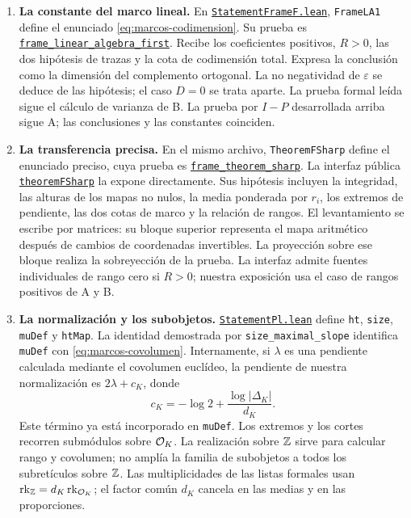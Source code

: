 \begin{enumerate}
\item \textbf{La constante del marco lineal.}
En
\href{https://github.com/CocoSgt/riemann-hypothesis-lean/blob/7cbf7a0c32fca1badf05931879a37c3f8a2b03b4/src/Formalism/HarderNarasimhan/StatementFrameF.lean}{\texttt{StatementFrameF.lean}},
\texttt{FrameLA1} define el enunciado
\eqref{eq:marcos-codimension}. Su prueba es
\href{https://github.com/CocoSgt/riemann-hypothesis-lean/blob/7cbf7a0c32fca1badf05931879a37c3f8a2b03b4/src/Formalism/HarderNarasimhan/HarderNarasimhanProofs/FrameLinearAlgebraFirst.lean}{\texttt{frame\_linear\_algebra\_first}}.
Recibe los coeficientes positivos, $R>0$, las dos hipótesis de trazas
y la cota de codimensión total. Expresa la conclusión como la dimensión
del complemento ortogonal. La no negatividad de $\varepsilon$ se deduce
de las hipótesis; el caso $D=0$ se trata aparte. La prueba formal leída
sigue el cálculo de varianza de B. La prueba por $I-P$ desarrollada
arriba sigue A; las conclusiones y las constantes coinciden.

\item \textbf{La transferencia precisa.}
En el mismo archivo, \texttt{TheoremFSharp} define el enunciado
preciso, cuya prueba es
\href{https://github.com/CocoSgt/riemann-hypothesis-lean/blob/7cbf7a0c32fca1badf05931879a37c3f8a2b03b4/src/Formalism/HarderNarasimhan/HarderNarasimhanProofs/TheoremFSharp.lean}{\texttt{frame\_theorem\_sharp}}.
La interfaz pública
\href{https://github.com/CocoSgt/riemann-hypothesis-lean/blob/7cbf7a0c32fca1badf05931879a37c3f8a2b03b4/src/Formalism/HarderNarasimhan/ShiftInvariance.lean}{\texttt{theoremFSharp}}
la expone directamente. Sus hipótesis incluyen la integridad, las alturas
de los mapas no nulos, la media ponderada por $r_i$, los extremos de
pendiente, las dos cotas de marco y la relación de rangos.
El levantamiento se escribe por matrices: su bloque superior representa
el mapa aritmético después de cambios de coordenadas invertibles.
La proyección sobre ese bloque realiza la sobreyección de la prueba.
La interfaz admite fuentes individuales de rango cero si $R>0$;
nuestra exposición usa el caso de rangos positivos de A y B.

\item \textbf{La normalización y los subobjetos.}
\href{https://github.com/CocoSgt/riemann-hypothesis-lean/blob/7cbf7a0c32fca1badf05931879a37c3f8a2b03b4/src/Formalism/HarderNarasimhan/StatementPl.lean}{\texttt{StatementPl.lean}}
define \texttt{ht}, \texttt{size}, \texttt{muDef} y \texttt{htMap}.
La identidad demostrada por \texttt{size\_maximal\_slope} identifica
\texttt{muDef} con \eqref{eq:marcos-covolumen}. Internamente,
si $\lambda$ es una pendiente calculada mediante el covolumen euclídeo,
la pendiente de nuestra normalización es $2\lambda+c_K$, donde
\[
 c_K=-\log2+\frac{\log|\Delta_K|}{d_K}.
\]
Este término ya está incorporado en \texttt{muDef}.
Los extremos y los cortes recorren submódulos sobre $\mathcal{O}_K$.
La realización sobre $\mathbb{Z}$ sirve para calcular rango y covolumen;
no amplía la familia de subobjetos a todos los subretículos sobre $\mathbb{Z}$.
Las multiplicidades de las listas formales usan
$\operatorname{rk}_{\mathbb{Z}}=d_K\operatorname{rk}_{\mathcal{O}_K}$; el factor común
$d_K$ cancela en las medias y en las proporciones.


\end{enumerate}
